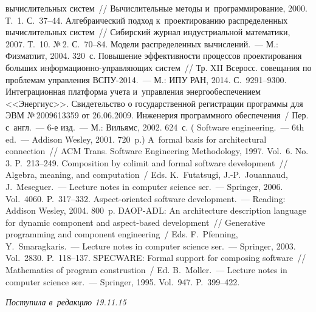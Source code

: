 \begin{multicols}{2}
{{\begin{thebibliography}{99}
вычислительных сис\-тем~// Вычислительные методы и~программирование, 2000. Т.~1. 
С.~37--44.
 Алгебраический подход к~проектированию распределенных 
вычислительных сис\-тем~// Сибирский журнал индустриальной математики, 2007. Т.~10. 
№\,2. С.~70--84.
 Модели распределенных вычислений.~--- М.: Физматлит, 2004. 320~с.
 Повышение эффективности процессов проектирования больших  
ин\-фор\-ма\-ци\-он\-но-управ\-ля\-ющих сис\-тем~// Тр. XII Всеросс. совещания по  
проб\-ле\-мам управления ВСПУ-2014.~--- М.: ИПУ РАН, 2014. С.~9291--9300.
 Интеграционная платформа учета 
и~управления энергообеспечением <<Энергиус>>. Свидетельство о государственной 
регистрации программы для ЭВМ №\,2009613359 от 26.06.2009.
 Инженерия программного обеспечения~/ Пер. с~англ.~--- 6-е изд.~--- М.: 
Вильямс, 2002. 624~с. ( Software engineering.~--- 6th ed.~--- Addison 
Wesley, 2001. 720~p.)
 A~formal basis for architectural connection~// ACM Trans. Software 
Engineering Methodology, 1997. Vol.~6. No.\,3. P.~213--249.
 Composition by colimit and formal software development~// 
Algebra, meaning, and computation~/ Eds. K.~Futatsugi, J.-P.~Jouannaud, J.~Meseguer.~---
Lecture notes  in computer science ser.~--- Springer, 2006. Vol.~4060. P.~317--332.
Aspect-oriented software development.~--- Reading: Addison Wesley, 2004. 800~p.
 DAOP-ADL: An architecture description language for 
dynamic component and aspect-based development~// Generative programming and component
engineering~/ Eds. F.~Pfenning, Y.~Smaragkaris.~---
Lecture notes in computer science ser.~--- Springer, 2003. 
Vol.~2830. P.~118--137.
 SPECWARE: Formal support for composing 
software~// Mathematics of program construstion~/
Ed. B.~M$\ddot{\mbox{o}}$ller.~--- Lecture notes in computer science ser.~---
Springer, 1995. Vol.~947. P.~399--422. 
\end{thebibliography}

 }
 }

\end{multicols}

\vspace*{-3pt}

\hfill{\small\textit{Поступила в~редакцию 19.11.15}}

